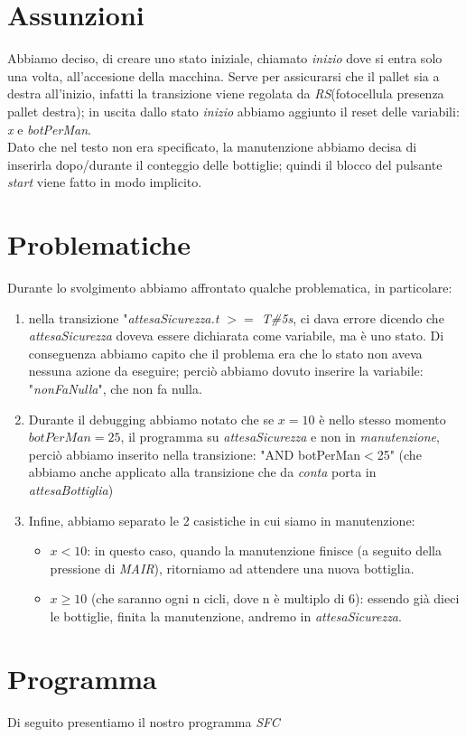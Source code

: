 \documentclass{article}
\begin{document}
\section{Assunzioni}
Abbiamo deciso, di creare uno stato iniziale, chiamato \textit{inizio} dove si entra solo una volta, all'accesione della macchina. Serve per assicurarsi che il pallet sia a destra all'inizio, infatti la transizione viene regolata da \textit{RS}(fotocellula presenza pallet destra); in uscita dallo stato \textit{inizio} abbiamo aggiunto il reset delle variabili: \textit{x} e \textit{botPerMan}.  
\\

Dato che nel testo non era specificato, la manutenzione abbiamo decisa di inserirla dopo/durante il conteggio delle bottiglie; quindi il blocco del pulsante \textit{start} viene fatto in modo implicito.


\section{Problematiche}
Durante lo svolgimento abbiamo affrontato qualche problematica, in particolare:
\begin{enumerate}
    \item nella transizione "\textit{attesaSicurezza.t $>=$ T\#5s}, ci dava errore dicendo che \textit{attesaSicurezza} doveva essere dichiarata come variabile, ma è uno stato. Di conseguenza abbiamo capito che il problema era che lo stato non aveva nessuna azione da eseguire; perciò abbiamo dovuto inserire la variabile: "\textit{nonFaNulla}", che non fa nulla.
    \item Durante il debugging abbiamo notato che se $x = 10$ è nello stesso momento $botPerMan = 25$, il programma su \textit{attesaSicurezza} e non in \textit{manutenzione}, perciò abbiamo inserito nella transizione: "AND botPerMan$<$25" (che abbiamo anche applicato alla transizione che da \textit{conta} porta in \textit{attesaBottiglia})
    \item Infine, abbiamo separato le 2 casistiche in cui siamo in manutenzione:
          \begin{itemize}
              \item $x < 10$: in questo caso, quando la manutenzione finisce (a seguito della pressione di \textit{MAIR}), ritorniamo ad attendere una nuova bottiglia.
              \item $x \geq 10$ (che saranno ogni n cicli, dove n è multiplo di 6):  essendo già dieci le bottiglie, finita la manutenzione, andremo in \textit{attesaSicurezza}.
          \end{itemize}
\end{enumerate}

\section{Programma}
Di seguito presentiamo il nostro programma \textit{SFC}

\end{document}
